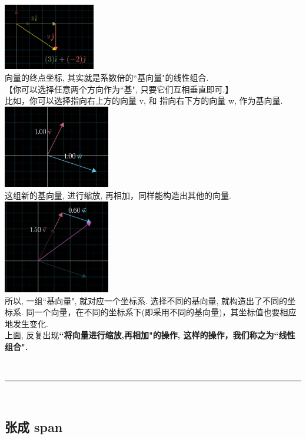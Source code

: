 \documentclass[UTF8]{ctexart}
\begin{document}
\includegraphics[width=0.3\textwidth]{img/0069.png}\\

向量的终点坐标, 其实就是系数倍的``基向量"的线性组合.\\



【你可以选择任意两个方向作为``基", 只要它们互相垂直即可.】 \\
比如，你可以选择指向右上方的向量 v, 和 指向右下方的向量 w, 作为基向量. \\
\includegraphics[width=0.35\textwidth]{img/0102.png}\\

这组新的基向量, 进行缩放, 再相加，同样能构造出其他的向量.\\
\includegraphics[width=0.35\textwidth]{img/0103.png}\\

所以, 一组``基向量", 就对应一个坐标系. 选择不同的基向量, 就构造出了不同的坐标系. 同一个向量，在不同的坐标系下(即采用不同的基向量)，其坐标值也要相应地发生变化. \\

上面, 反复出现\textbf{``将向量进行缩放,再相加"的操作, 这样的操作，我们称之为``线性组合".}


~\\
\hrule
~\\

\subsection{张成 span}
\end{document}
